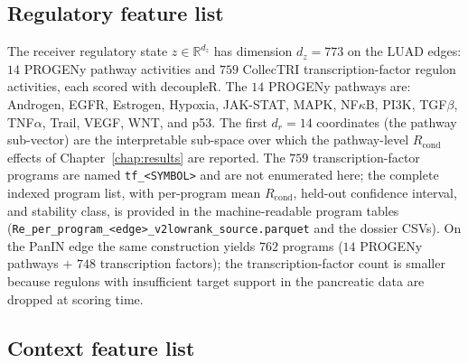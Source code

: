 \subsection{Regulatory feature list}\label{sec:app-c-regfeatures}

The receiver regulatory state $z \in \mathbb{R}^{d_z}$ has dimension $d_z = 773$ on the LUAD edges:
$14$ PROGENy pathway activities and $759$ CollecTRI transcription-factor regulon activities, each
scored with decoupleR. The $14$ PROGENy pathways are: Androgen, EGFR, Estrogen, Hypoxia, JAK-STAT,
MAPK, NF$\kappa$B, PI3K, TGF$\beta$, TNF$\alpha$, Trail, VEGF, WNT, and p53. The first $d_r = 14$
coordinates (the pathway sub-vector) are the interpretable sub-space over which the pathway-level
$R_{\mathrm{cond}}$ effects of Chapter~\ref{chap:results} are reported. The $759$ transcription-factor
programs are named \texttt{tf\_<SYMBOL>} and are not enumerated here; the complete indexed program
list, with per-program mean $R_{\mathrm{cond}}$, held-out confidence interval, and stability class,
is provided in the machine-readable program tables (\texttt{Re\_per\_program\_<edge>\_v2lowrank\_source.parquet}
and the dossier CSVs). On the PanIN edge the same construction yields $762$ programs
($14$ PROGENy pathways $+$ $748$ transcription factors); the transcription-factor count is smaller
because regulons with insufficient target support in the pancreatic data are dropped at scoring time.

\subsection{Context feature list}\label{sec:app-c-ctxfeatures}

